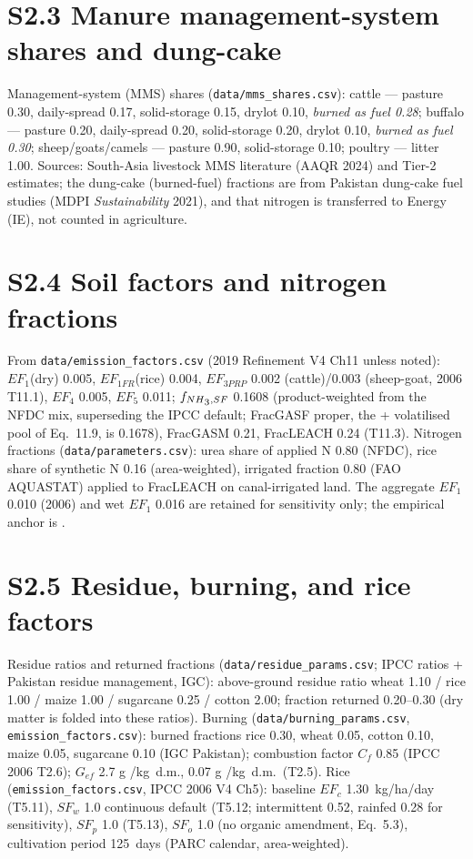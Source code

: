 \section*{S2.3 Manure management-system shares and dung-cake}

Management-system (MMS) shares (\texttt{data/mms\_shares.csv}): cattle --- pasture
0.30, daily-spread 0.17, solid-storage 0.15, drylot 0.10, \emph{burned as fuel
0.28}; buffalo --- pasture 0.20, daily-spread 0.20, solid-storage 0.20, drylot 0.10,
\emph{burned as fuel 0.30}; sheep/goats/camels --- pasture 0.90, solid-storage 0.10;
poultry --- litter 1.00. Sources: South-Asia livestock MMS literature (AAQR 2024) and
Tier-2 estimates; the dung-cake (burned-fuel) fractions are from Pakistan dung-cake
fuel studies (MDPI \emph{Sustainability} 2021), and that nitrogen is transferred to
Energy (IE), not counted in agriculture.

\section*{S2.4 Soil \NtwoO{} factors and nitrogen fractions}

From \texttt{data/emission\_factors.csv} (2019 Refinement V4 Ch11 unless noted):
$EF_1$(dry) 0.005, $EF_{1FR}$(rice) 0.004, $EF_{3PRP}$ 0.002 (cattle)/0.003
(sheep-goat, 2006 T11.1), $EF_4$ 0.005, $EF_5$ 0.011; $f_{NH\textsubscript{3}{},SF}$ 0.1608
(product-weighted from the NFDC mix, superseding the IPCC default; FracGASF proper,
the \NHthree{}+\NOx{} volatilised pool of Eq.~11.9, is 0.1678), FracGASM 0.21,
FracLEACH 0.24 (T11.3). Nitrogen fractions (\texttt{data/parameters.csv}): urea share
of applied N 0.80 (NFDC), rice share of synthetic N 0.16 (area-weighted), irrigated
fraction 0.80 (FAO AQUASTAT) applied to FracLEACH on canal-irrigated land. The
aggregate $EF_1$ 0.010 (2006) and wet $EF_1$ 0.016 are retained for sensitivity only;
the empirical anchor is \citet{cui2021}.

\section*{S2.5 Residue, burning, and rice factors}

Residue ratios and returned fractions (\texttt{data/residue\_params.csv}; IPCC ratios
+ Pakistan residue management, IGC): above-ground residue ratio wheat 1.10 / rice 1.00
/ maize 1.00 / sugarcane 0.25 / cotton 2.00; fraction returned 0.20--0.30 (dry matter
is folded into these ratios). Burning (\texttt{data/burning\_params.csv},
\texttt{emission\_factors.csv}): burned fractions rice 0.30, wheat 0.05, cotton 0.10,
maize 0.05, sugarcane 0.10 (IGC Pakistan); combustion factor $C_f$ 0.85 (IPCC 2006
T2.6); $G_{ef}$ 2.7 g \CHfour{}/kg~d.m., 0.07 g \NtwoO{}/kg~d.m.\ (T2.5). Rice
(\texttt{emission\_factors.csv}, IPCC 2006 V4 Ch5): baseline $EF_c$ 1.30~kg/ha/day
(T5.11), $SF_w$ 1.0 continuous default (T5.12; intermittent 0.52, rainfed 0.28 for
sensitivity), $SF_p$ 1.0 (T5.13), $SF_o$ 1.0 (no organic amendment, Eq.~5.3),
cultivation period 125~days (PARC calendar, area-weighted).

